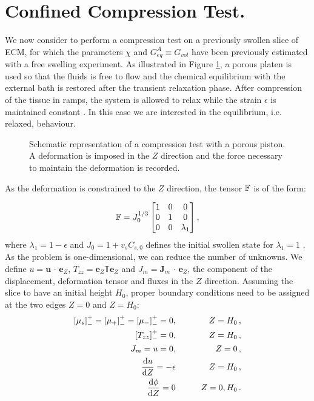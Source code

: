 \section{Confined Compression Test.}
\label{excomp}
We now consider to perform a compression test on a previously swollen slice of ECM, for which the parameters $\chi$ and $G^A_{eq}\equiv G_{vol}$ have been previously estimated with a free swelling experiment. As illustrated in Figure \ref{confcomp}, a porous platen is used so that the fluids is free to flow and the chemical equilibrium with the external bath is restored after the transient relaxation phase. After compression of the tissue in ramps, the system is allowed to relax while the strain $\epsilon$ is maintained constant \cite{Netti}. In this case we are interested in the equilibrium, i.e. relaxed, behaviour. 

\begin{figure}[h]
	\centering
	\def\svgwidth{0.89\linewidth}
	
	\vspace{2mm}
	\caption{Schematic representation of a compression test with a porous piston. A deformation is imposed in the $Z$ direction and the force necessary to maintain the deformation is recorded. }
	\label{confcomp}
\end{figure}

As the deformation is constrained to the $Z$ direction, the tensor $\mathbb{F}$ is of the form:

\begin{equation}
\mathbb{F}=J_0^{1/3}\begin{bmatrix}
1 &0&0\\
0&1&0\\
0&0& \lambda_1
\end{bmatrix},
\label{F} 
\end{equation}
where $\lambda_1 = 1 - \epsilon$ and $J_0=1+v_sC_{s,0}$ defines the initial swollen state for $\lambda_1=1$ . As the problem is one-dimensional, we can reduce the number of unknowns. We define $u=\mathbf{u}\,\cdot\,\mathbf{e}_Z$, $T_{zz}= \mathbf{e}_Z \mathbb{T}\mathbf{e}_Z$ and $J_m=\mathbf{J}_m\,\cdot \,\mathbf{e}_Z$, the component of the displacement, deformation tensor and fluxes in the $Z$ direction. Assuming the slice to have an initial height $H_0$, proper boundary conditions need to be assigned at the two edges $Z=0$ and $Z=H_0$:
\begin{eqnarray}
\left[\mu_s\right]^+_-=\left[\mu_+\right]^+_-=\left[\mu_-\right]^+_-=0, &\qquad& Z=H_0\,,\\
\quad \left[T_{zz}\right]^+_-=0, &\qquad& Z=H_0\,,\\
J_m = u= 0, &\qquad& Z=0\, ,\\
\frac{\text{d} u}{\text{d} Z}=-\epsilon &\qquad& Z=H_0\,,\\
\frac{\text{d} \phi}{\text{d} Z}=0 &\qquad& Z=0,H_0\,.
\end{eqnarray}

